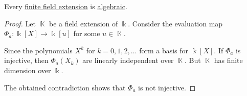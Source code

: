\begin{lemma}\label{thm:finite_field_extensions_are_algebraic}
  Every \hyperref[def:finite_field_extension]{finite field extension} is \hyperref[def:transcendetal_element]{algebraic}.
\end{lemma}
\begin{proof}
  Let \( \BbbK \) be a field extension of \( \Bbbk \). Consider the evaluation map \( \Phi_a: \Bbbk[X] \to \Bbbk[u] \) for some \( u \in \BbbK \).

  Since the polynomials \( X^k \) for \( k = 0, 1, 2, \ldots \) form a basis for \( \Bbbk[X] \). If \( \Phi_a \) is injective, then \( \Phi_a(X_k) \) are linearly independent over \( \BbbK \). But \( \BbbK \) has finite dimension over \( \Bbbk \).

  The obtained contradiction shows that \( \Phi_a \) is not injective.
\end{proof}

